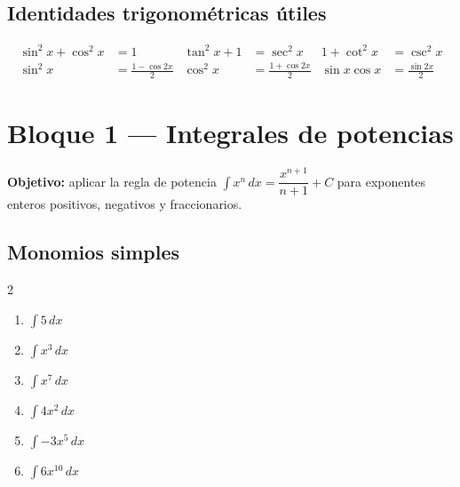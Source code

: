 \documentclass[12pt, letterpaper]{article}
\newcommand{\dx}{\,dx}
\begin{document}
\subsection{Identidades trigonométricas útiles}

\begin{cuadrosolucion}
\begin{align*}
  \sin^2 x + \cos^2 x &= 1 &
  \tan^2 x + 1 &= \sec^2 x &
  1 + \cot^2 x &= \csc^2 x \\[6pt]
  \sin^2 x &= \frac{1-\cos 2x}{2} &
  \cos^2 x &= \frac{1+\cos 2x}{2} &
  \sin x\cos x &= \frac{\sin 2x}{2}
\end{align*}
\end{cuadrosolucion}

\vspace{6pt}

\section{Bloque 1 — Integrales de potencias}

\begin{cuadroinfo}
\small\textbf{Objetivo:} aplicar la regla de potencia $\int x^n\dx = \dfrac{x^{n+1}}{n+1}+C$
para exponentes enteros positivos, negativos y fraccionarios.
\end{cuadroinfo}

\vspace{4pt}

\subsection{Monomios simples}

\begin{multicols}{2}
\begin{enumerate}[label=\textbf{\arabic*.}, leftmargin=*, itemsep=10pt]

  \item \facil\quad $\displaystyle\int 5\dx$

  \item \facil\quad $\displaystyle\int x^3 \dx$

  \item \facil\quad $\displaystyle\int x^7 \dx$

  \item \facil\quad $\displaystyle\int 4x^2 \dx$

  \item \facil\quad $\displaystyle\int -3x^5 \dx$

  \item \facil\quad $\displaystyle\int 6x^{10} \dx$

\end{enumerate}
\end{multicols}
\end{document}
